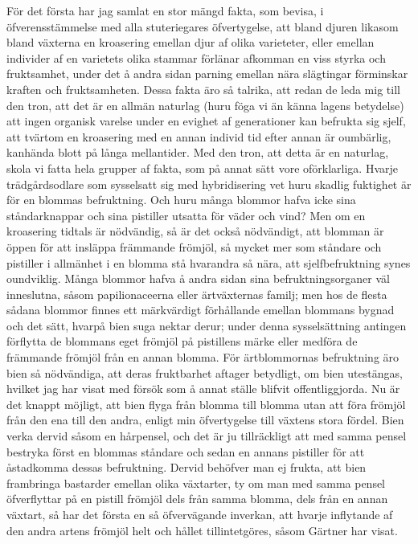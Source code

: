 För det första har jag samlat en stor mängd fakta, som bevisa, i öfverensstämmelse med alla stuteriegares öfvertygelse, att bland djuren likasom bland växterna en kroasering emellan djur af olika varieteter, eller emellan individer af en varietets olika stammar förlänar afkomman en viss styrka och fruktsamhet, under det å andra sidan parning emellan nära slägtingar förminskar kraften och fruktsamheten. Dessa fakta äro så talrika, att redan de leda mig till den tron, att det är en allmän naturlag (huru föga vi än känna lagens betydelse) att ingen organisk varelse under en evighet af generationer kan befrukta sig sjelf, att tvärtom en kroasering med en annan individ tid efter annan är oumbärlig, kanhända blott på långa mellantider.
Med den tron, att detta är en naturlag, skola vi fatta hela grupper af fakta, som på annat sätt vore oförklarliga. Hvarje trädgårdsodlare som sysselsatt sig med hybridisering vet huru skadlig fuktighet är för en blommas befruktning. Och huru många blommor hafva icke sina ståndarknappar och sina pistiller utsatta för väder och vind? Men om en kroasering tidtals är nödvändig, så är det också nödvändigt, att blomman är öppen för att insläppa främmande frömjöl, så mycket mer som ståndare och pistiller i allmänhet i en blomma stå hvarandra så nära, att sjelfbefruktning synes oundviklig. Många blommor hafva å andra sidan sina befruktningsorganer väl inneslutna, såsom papilionaceerna eller ärtväxternas familj; men hos de flesta sådana blommor finnes ett märkvärdigt förhållande emellan blommans bygnad och det sätt, hvarpå bien suga nektar derur; under denna sysselsättning antingen förflytta de blommans eget frömjöl på pistillens märke eller medföra de främmande frömjöl från en annan blomma. För ärtblommornas befruktning äro bien så nödvändiga, att deras fruktbarhet aftager betydligt, om bien utestängas, hvilket jag har visat med försök som å annat ställe blifvit offentliggjorda. Nu är det knappt möjligt, att bien flyga från blomma till blomma utan att föra frömjöl från den ena till den andra, enligt min öfvertygelse till växtens stora fördel. Bien verka dervid såsom en hårpensel, och det är ju tillräckligt att med samma pensel bestryka först en blommas ståndare och sedan en annans pistiller för att åstadkomma dessas befruktning. Dervid behöfver man ej frukta, att bien frambringa bastarder emellan olika växtarter, ty om man med samma pensel öfverflyttar på en pistill frömjöl dels från samma blomma, dels från en annan växtart, så har det första en så öfvervägande inverkan, att hvarje inflytande af den andra artens frömjöl helt och hållet tillintetgöres, såsom Gärtner har visat.

